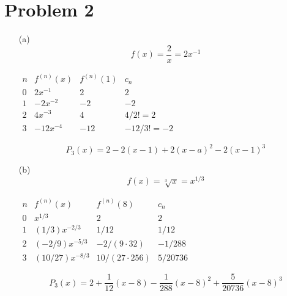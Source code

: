 \documentclass[preview, margin=0.6in]{standalone}
\newcommand*{\problem}[1]{\section*{Problem #1}}
\begin{document}
\problem{2}
\begin{itemize}
	\item[(a)]
		\begin{equation*}
			f(x)=\frac 2x=2x^{-1}
		\end{equation*}

		\begin{center}
			$\begin{array}{c|cl|c|c}
				n & f^{(n)}(x) & f^{(n)}(1) & c_n \\
				\hline
				0 & 2x^{-1} & 2 & 2 \\
				1 & -2x^{-2} & -2 & -2 \\
				2 & 4x^{-3} & 4 & 4/2!=2 \\
				3 & -12x^{-4} & -12 & -12/3!=-2
			\end{array}$
		\end{center}

		\begin{equation*}
			\boxed{P_3(x)
			=2-2(x-1)+2(x-a)^2-2(x-1)^3}
		\end{equation*}

	\item[(b)]
		\begin{equation*}
			f(x)=\sqrt[3]{x}=x^{1/3}
		\end{equation*}

		\begin{center}
			$\begin{array}{c|c|c|c}
				n & f^{(n)}(x) & f^{(n)}(8) & c_n \\
				\hline
				0 & x^{1/3} & 2 & 2 \\
				1 & (1/3)x^{-2/3} & 1/12 & 1/12 \\
				2 & (-2/9)x^{-5/3} & -2/(9\cdot32) & -1/288 \\
				3 & (10/27)x^{-8/3} & 10/(27 \cdot 256) & 5/20736
			\end{array}$
		\end{center}

		\begin{equation*}
			\boxed{P_3(x)
			=2+\frac{1}{12}(x-8)-\frac{1}{288}(x-8)^2+\frac{5}{20736}(x-8)^3}
		\end{equation*}
\end{itemize}
\end{document}
